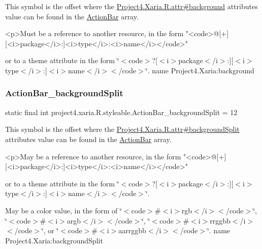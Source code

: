 This symbol is the offset where the \hyperlink{}{Project4.\+Xaria.\+R.\+attr\#background} attribute\textquotesingle{}s value can be found in the \hyperlink{classproject4_1_1xaria_1_1R_1_1styleable_accb530194c58ee3abb15587da8869e99}{Action\+Bar} array.

\begin{DoxyVerb}      <p>Must be a reference to another resource, in the form "<code>@[+][<i>package</i>:]<i>type</i>:<i>name</i></code>"
\end{DoxyVerb}
 or to a theme attribute in the form \char`\"{}$<$code$>$?\mbox{[}$<$i$>$package$<$/i$>$\+:\mbox{]}\mbox{[}$<$i$>$type$<$/i$>$\+:\mbox{]}$<$i$>$name$<$/i$>$$<$/code$>$\char`\"{}.  name Project4.\+Xaria\+:background \mbox{\label{classproject4_1_1xaria_1_1R_1_1styleable_a0a05b0d40453638b3b59df9b162097ec}} 
\subsubsection{\texorpdfstring{Action\+Bar\+\_\+background\+Split}{ActionBar\_backgroundSplit}}
{\footnotesize\ttfamily static final int project4.\+xaria.\+R.\+styleable.\+Action\+Bar\+\_\+background\+Split = 12\hspace{0.3cm}{\ttfamily [static]}}

This symbol is the offset where the \hyperlink{}{Project4.\+Xaria.\+R.\+attr\#background\+Split} attribute\textquotesingle{}s value can be found in the \hyperlink{classproject4_1_1xaria_1_1R_1_1styleable_accb530194c58ee3abb15587da8869e99}{Action\+Bar} array.

\begin{DoxyVerb}      <p>May be a reference to another resource, in the form "<code>@[+][<i>package</i>:]<i>type</i>:<i>name</i></code>"
\end{DoxyVerb}
 or to a theme attribute in the form \char`\"{}$<$code$>$?\mbox{[}$<$i$>$package$<$/i$>$\+:\mbox{]}\mbox{[}$<$i$>$type$<$/i$>$\+:\mbox{]}$<$i$>$name$<$/i$>$$<$/code$>$\char`\"{}. 

May be a color value, in the form of \char`\"{}$<$code$>$\#$<$i$>$rgb$<$/i$>$$<$/code$>$\char`\"{}, \char`\"{}$<$code$>$\#$<$i$>$argb$<$/i$>$$<$/code$>$\char`\"{}, \char`\"{}$<$code$>$\#$<$i$>$rrggbb$<$/i$>$$<$/code$>$\char`\"{}, or \char`\"{}$<$code$>$\#$<$i$>$aarrggbb$<$/i$>$$<$/code$>$\char`\"{}.  name Project4.\+Xaria\+:background\+Split \mbox{\label{classproject4_1_1xaria_1_1R_1_1styleable_aff562ad353237ec535896356fc27af79}} 
